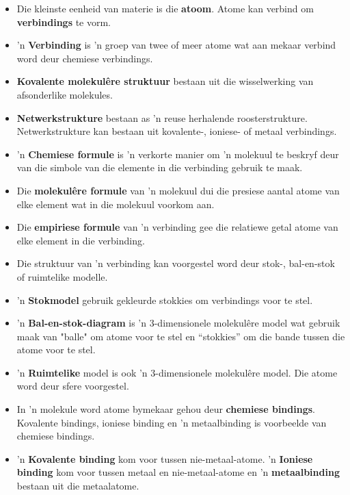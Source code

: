       \label{m38120*id311034}\begin{itemize}[noitemsep]
            \label{m38120*uid67}\item Die kleinste eenheid van materie is die \textbf{atoom}. Atome kan verbind om \textbf{verbindings} te vorm.
\label{m38120*uid68}\item 'n \textbf{Verbinding} is 'n groep van twee of meer atome wat aan mekaar verbind word deur chemiese verbindings. 
\label{m38120*uid69}\item \textbf{Kovalente molekul\^{e}re struktuur} bestaan uit die wisselwerking van afsonderlike molekules.
\item \textbf{Netwerkstrukture} bestaan as 'n reuse herhalende roosterstrukture. Netwerkstrukture kan bestaan uit kovalente-, ioniese- of metaal verbindings.  
\label{m38120*uid71}\item 'n \textbf{Chemiese formule} is 'n verkorte manier om 'n molekuul te beskryf deur van die simbole van die elemente in die verbinding gebruik te maak.
\label{m38120*uid72}\item Die \textbf{molekul\^{e}re formule} van 'n molekuul dui die presiese aantal atome van elke element wat in die molekuul voorkom aan.
\label{m38120*uid73}\item Die \textbf{empiriese formule} van 'n verbinding gee die relatiewe getal atome van elke element in die verbinding.
\label{m38120*uid70}\item Die struktuur van 'n verbinding kan voorgestel word deur stok-, bal-en-stok of ruimtelike modelle.
\item 'n \textbf{Stokmodel} gebruik gekleurde stokkies om verbindings voor te stel.
\label{m38120*uid75}\item 'n \textbf{Bal-en-stok-diagram} is 'n 3-dimensionele molekulêre model wat gebruik maak van "balle" om atome voor te stel en “stokkies” om die bande tussen die atome voor te stel.
\label{m38120*uid76}\item 'n \textbf{Ruimtelike} model is ook 'n 3-dimensionele molekulêre model. Die atome word deur sfere voorgestel.
\label{m38120*uid77}\item In 'n molekule word atome bymekaar gehou deur \textbf{chemiese bindings}. Kovalente bindings, ioniese binding en 'n metaalbinding is voorbeelde van chemiese bindings.
\label{m38120*uid78}\item 'n \textbf{Kovalente binding} kom voor tussen nie-metaal-atome. 'n \textbf{Ioniese binding} kom voor tussen metaal en nie-metaal-atome en 'n \textbf{metaalbinding} bestaan uit die metaalatome.
\end{itemize}

